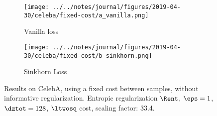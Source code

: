 \begin{figure}[!htbp]
   \centering
\begin{subfigure}[t]{0.48\textwidth}
   \texttt{[image: ../../notes/journal/figures/2019-04-30/celeba/fixed-cost/a\_vanilla.png]}
   \caption{Vanilla loss}
   \label{fig:.._.._notes_journal_figures_2019-04-30_celeba_fixed-cost-a}
\end{subfigure}
\begin{subfigure}[t]{0.48\textwidth}
   \texttt{[image: ../../notes/journal/figures/2019-04-30/celeba/fixed-cost/b\_sinkhorn.png]}
   \caption{Sinkhorn Loss}
   \label{fig:.._.._notes_journal_figures_2019-04-30_celeba_fixed-cost-b}
\end{subfigure}
   \caption{Results on CelebA, using a fixed cost between samples, without informative regularization. Entropic regularization $\Rent$, $\eps = 1$, $\dztot = 128$, $\ltwosq$ cost, scaling factor: 33.4.}
   \label{fig:.._.._notes_journal_figures_2019-04-30_celeba_fixed-cost}
\end{figure}